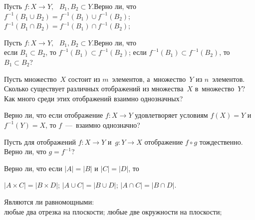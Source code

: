 \documentclass[a4paper,12pt]{article}
\begin{document}
Пусть $f:X\to Y,\,\,$ $B_1,B_2\subset Y$.\quad Верно ли, что\\
 $f^{-1}(B_{1}\cup B_{2})=f^{-1}(B_{1})\cup f^{-1}(B_{2})$;
 $f^{-1}(B_{1}\cap  B_{2})=f^{-1}(B_{1})\cap f^{-1}(B_{2})$;

Пусть $f:X\to Y,\,\,$ $B_1,B_2\subset Y$.\quad Верно ли, что\\
 если $B_{1}\subset B_{2}$, то $f^{-1}(B_{1})\subset f^{-1}(B_{2})$;
 если $f^{-1}(B_{1})\subset f^{-1}(B_{2})$, то $B_{1}\subset B_{2}$?

Пусть множество~$X$ состоит из $m$~элементов, а~множество~$Y$ из $n$~элементов.\\
 Сколько существует различных отображений из множества~$X$ в~множество~$Y$?\\
 Как много среди этих отображений взаимно однозначных?

Верно ли, что если отображение $f:X\to Y$ удовлетворяет условиям $f(X)=Y$ и~$f^{-1}(Y)=X$, то $f$~---~взаимно однозначно?

Пусть для отображений $f:X\to Y$ и~$g:Y\to X$ отображение $f\circ g$ тождественно. Верно ли, что $g=f^{-1}$?

Верно ли, что если $|A|=|B|$ и $|C|=|D|$, то\par\noindent
{} $|A\times C|=|B \times D|$;
 $|A\cup C|=|B \cup D|$;
 $|A\cap C|=|B \cap D|$.
%
%
%
%

Являются ли равномощными:\\
 любые два отрезка на плоскости;
 любые две окружности на плоскости;
\end{document}
